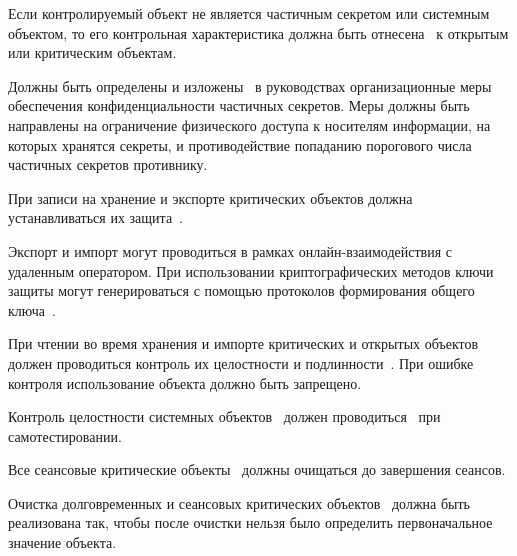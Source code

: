 Если контролируемый объект не является частичным секретом или системным
объектом, то его контрольная характеристика должна быть 
отнесена~ к открытым или критическим объектам.

\label{R.DP.Org} %
Должны быть определены и изложены~ 
в руководствах организационные меры обеспечения конфиденциальности 
частичных секретов. Меры должны быть направлены на ограничение физического 
доступа к носителям информации, на которых хранятся секреты, и 
противодействие попаданию порогового числа частичных секретов 
противнику. 

\label{R.DP.Export} %
При записи на хранение и экспорте критических объектов должна 
устанавливаться их защита~.

\begin{note}
Экспорт и импорт могут проводиться в рамках онлайн-взаимодействия с удаленным
оператором. При использовании криптографических методов ключи защиты 
могут генерироваться с помощью протоколов формирования общего 
ключа~.
\end{note}

\label{R.DP.Import} %
При чтении во время хранения и импорте критических и открытых объектов  
должен проводиться контроль их целостности и подлинности~. 
При ошибке контроля использование объекта должно быть запрещено. 

\label{R.DP.System} %
Контроль целостности системных объектов~ 
должен проводиться~ при самотестировании.

\label{R.DP.Session} %
Все сеансовые критические объекты~
должны очищаться до завершения сеансов.

\label{R.DP.Zero} %
Очистка долговременных и сеансовых критических объектов~ 
должна быть реализована так, чтобы после очистки нельзя было определить 
первоначальное значение объекта. 

\label{R.DP.NonExtr} %

\label{R.DP.Sys} %
